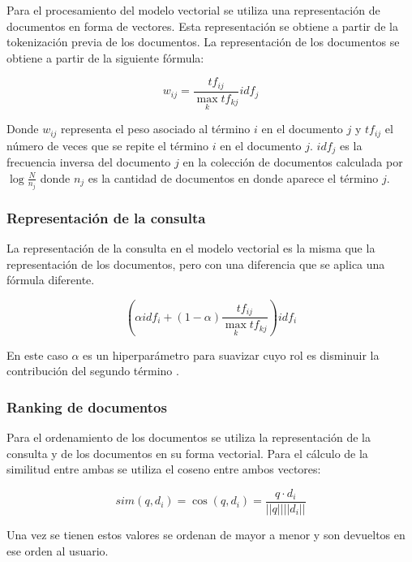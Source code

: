 \documentclass[runningheads]{llncs}
\begin{document}
Para el procesamiento del modelo vectorial se utiliza una representación de documentos en forma de
vectores. Esta representación se obtiene a partir de la tokenización previa de los documentos. La
representación de los documentos se obtiene a partir de la siguiente fórmula:

\begin{equation}
    w_{ij} = \frac{tf_{ij}}{\max_{k} tf_{kj}}idf_{j}
\end{equation}

Donde $w_{ij}$ representa el peso asociado al término $i$ en el documento $j$ y $tf_{ij}$ el número de veces que
se repite el término $i$ en el documento $j$. $idf_{j}$ es la frecuencia inversa del documento $j$ en la
colección de documentos calculada por $\log{\frac{N}{n_j}}$ donde $n_j$ es la cantidad de documentos
en donde aparece el término $j$.

\subsubsection{Representación de la consulta}

La representación de la consulta en el modelo vectorial es la misma que la representación de los 
documentos, pero con una diferencia que se aplica una fórmula diferente.

\begin{equation}
    (\alpha idf_i + (1-\alpha)\frac{tf_{ij}}{\max_{k} tf_{kj}}) idf_i
\end{equation}

En este caso $\alpha$ es un hiperparámetro para suavizar cuyo rol es disminuir
la contribución del segundo término \cite{alphaManning}.

\subsubsection{Ranking de documentos}

Para el ordenamiento de los documentos se utiliza la representación de la consulta y de los documentos
en su forma vectorial. Para el cálculo de la similitud entre ambas se utiliza el coseno entre
ambos vectores:

\begin{equation}
    sim(q,d_i) = \cos(q, d_i) = \frac{q \cdot d_i}{||q|| ||d_i||}
\end{equation}

Una vez se tienen estos valores se ordenan de mayor a menor y son devueltos en ese orden al
usuario.
\end{document}
